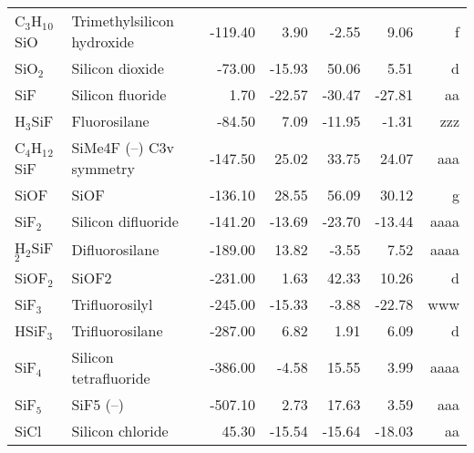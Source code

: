 \begin{table}
\begin{center}
\begin{tabular}{llrrrrr}
 C$_3$H$_1$$_0$SiO    & Trimethylsilicon hydroxide             &  -119.40    &     3.90  &    -2.55  &     9.06  &      f\\
 SiO$_2$        & Silicon dioxide                        &   -73.00    &   -15.93  &    50.06  &     5.51  &      d\\
 SiF         & Silicon fluoride                       &     1.70    &   -22.57  &   -30.47  &   -27.81  &     aa\\
 H$_3$SiF       & Fluorosilane                           &   -84.50    &     7.09  &   -11.95  &    -1.31  &    zzz\\
 C$_4$H$_1$$_2$SiF    & SiMe4F (--) C3v symmetry                &  -147.50    &    25.02  &    33.75  &    24.07  &    aaa\\
 SiOF        & SiOF                                   &  -136.10    &    28.55  &    56.09  &    30.12  &      g\\
 SiF$_2$        & Silicon difluoride                     &  -141.20    &   -13.69  &   -23.70  &   -13.44  &   aaaa\\
 H$_2$SiF$_2$      & Difluorosilane                         &  -189.00    &    13.82  &    -3.55  &     7.52  &   aaaa\\
 SiOF$_2$       & SiOF2                                  &  -231.00    &     1.63  &    42.33  &    10.26  &      d\\
 SiF$_3$        & Trifluorosilyl                         &  -245.00    &   -15.33  &    -3.88  &   -22.78  &    www\\
 HSiF$_3$       & Trifluorosilane                        &  -287.00    &     6.82  &     1.91  &     6.09  &      d\\
 SiF$_4$        & Silicon tetrafluoride                  &  -386.00    &    -4.58  &    15.55  &     3.99  &   aaaa\\
 SiF$_5$        & SiF5 (--)                               &  -507.10    &     2.73  &    17.63  &     3.59  &    aaa\\
 SiCl        & Silicon chloride                       &    45.30    &   -15.54  &   -15.64  &   -18.03  &     aa\\
\hline
\end{tabular}
\end{center}
\end{table}
\clearpage

